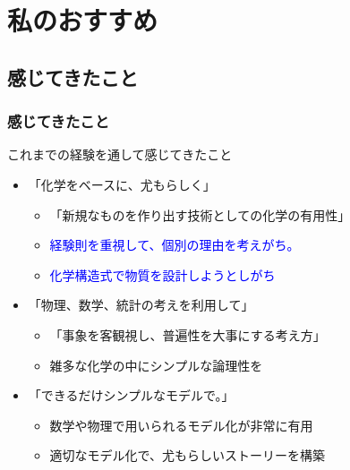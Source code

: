 \documentclass[unicode,12pt]{beamer}%
\begin{document}
\section{私のおすすめ}
\subsection{感じてきたこと}
\begin{frame}
	\frametitle{感じてきたこと}
		\begin{alertblock}{これまでの経験を通して感じてきたこと}
			\begin{itemize}
				\item 「化学をベースに、尤もらしく」
				\begin{itemize}
					\item 「新規なものを作り出す技術としての\alert{化学の有用性}」
					\item \textcolor{blue}{経験則を重視して、個別の理由を考えがち。}
					\item \textcolor{blue}{化学構造式で物質を設計しようとしがち}
				\end{itemize}
				\item 「物理、数学、統計の考えを利用して」
				\begin{itemize}
					\item 「\alert{事象を客観視し、普遍性を大事}にする考え方」
					\item 雑多な化学の中に\alert{シンプルな論理性を}
				\end{itemize}
				\item 「できるだけシンプルなモデルで。」
				\begin{itemize}
					\item 数学や物理で用いられる\alert{モデル化が非常に有用}
					\item 適切なモデル化で、尤もらしいストーリーを構築
				\end{itemize}
			\end{itemize}
		\end{alertblock}
\end{frame}
\end{document}
